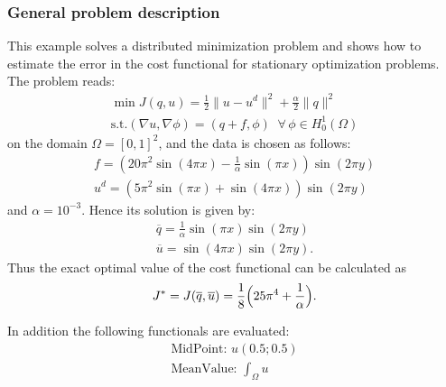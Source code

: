 \subsubsection{General problem description}
This example solves a distributed minimization problem
and shows how to estimate the error in the cost functional for stationary optimization
problems. The problem reads:
\begin{gather*}
\min J(q,u) = \frac{1}{2} \|u-u^d\|^2 + \frac{\alpha}{2}\|q\|^2\\
\text{s.t.} (\nabla u,\nabla \phi) = (q+f,\phi)\;\;\forall\,\phi \in H^1_0(\Omega)
\end{gather*}
on the domain $\Omega = [0,1]^2$, and the data is chosen as follows:
\begin{gather*}
 f = \left(20\pi^2  \sin(4 \pi x) - \frac{1}{\alpha}  \sin(\pi x)\right) \sin(2 \pi y)\\
 u^d = \left( 5 \pi^2 \sin(\pi x) + \sin(4 \pi x)\right)  \sin(2\pi y)
\end{gather*}
and $\alpha = 10^{-3}$.
Hence its solution is given by:
\begin{gather*}
 \overline{q} = \frac{1}{\alpha} \sin(\pi x) \sin(2 \pi y)\\
 \overline{u} = \sin(4 \pi x) \sin(2 \pi y).
\end{gather*}
Thus the exact optimal value of the cost functional can be calculated as 
\begin{gather*}
 J^* = J(\overline{q},\overline{u}) = \frac{1}{8}\Bigl(25\pi^4 + \frac{1}{\alpha}\Bigr).
\end{gather*}

In addition the following functionals are evaluated:
\begin{gather*}
  \text{MidPoint: } u(0.5 ; 0.5)\\[2mm]
  \text{MeanValue: }\int_\Omega u
\end{gather*}

